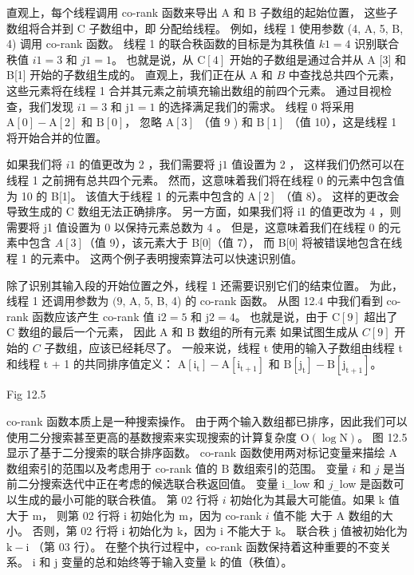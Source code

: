 直观上，每个线程调用 co-rank 函数来导出 $\mathrm{A}$ 和 $\mathrm{B}$ 子数组的起始位置，
这些子数组将合并到 $\mathrm{C}$ 子数组中，即 分配给线程。 例如，线程 1 使用参数 (4, A, 5, B, 4) 调用 co-rank 函数。 
线程 1 的联合秩函数的目标是为其秩值 $k 1=4$ 识别联合秩值 $i 1=3$ 和 $j 1=1$。 
也就是说，从 $\mathrm{C}[4]$ 开始的子数组是通过合并从 $\mathrm{A}$ [3] 和 B[1] 开始的子数组生成的。 
直观上，我们正在从 A 和 $B$ 中查找总共四个元素，这些元素将在线程 1 合并其元素之前填充输出数组的前四个元素。 
通过目视检查，我们发现 $i 1=3$ 和 $\mathrm{j} 1=1$ 的选择满足我们的需求。 
线程 0 将采用 $\mathrm{A}[0]-\mathrm{A}[2]$ 和 $\mathrm{B}[0]$，
忽略 $\mathrm{A}[3]$ （值 9 ) 和 $\mathrm{B}[1]$ （值 10），这是线程 1 将开始合并的位置。

如果我们将 $i 1$ 的值更改为 2 ，我们需要将 $\mathrm{j} 1$ 值设置为 2 ，
这样我们仍然可以在线程 1 之前拥有总共四个元素。 然而，这意味着我们将在线程 0 的元素中包含值为 10 的 B[1]。 
该值大于线程 1 的元素中包含的 $\mathrm{A}[2]$ （值 8）。 这样的更改会导致生成的 $\mathrm{C}$ 数组无法正确排序。 
另一方面，如果我们将 i1 的值更改为 4 ，则需要将 j1 值设置为 0 以保持元素总数为 4 。 
但是，这意味着我们在线程 0 的元素中包含 $A[3]$（值 9），该元素大于 B[0]（值 7），
而 B[0] 将被错误地包含在线程 1 的元素中。 这两个例子表明搜索算法可以快速识别值。

除了识别其输入段的开始位置之外，线程 1 还需要识别它们的结束位置。 
为此，线程 1 还调用参数为 $(9$, A, 5, B, 4) 的 co-rank 函数。 
从图 12.4 中我们看到 co-rank 函数应该产生 co-rank 值 $\mathrm{i} 2=5$ 和 $\mathrm{j} 2=4$。 
也就是说，由于 $\mathrm{C}[9]$ 超出了 $\mathrm{C}$ 数组的最后一个元素，
因此 $\mathrm{A}$ 和 $\mathrm{B}$ 数组的所有元素 如果试图生成从 $C[9]$ 开始的 $C$ 子数组，应该已经耗尽了。 
一般来说，线程 t 使用的输入子数组由线程 t 和线程 t + 1 的共同排序值定义：
$\mathrm{A}\left[ \mathrm{i}_{\mathrm{t}}\right]-\mathrm{A}\left[\mathrm{i}_{\mathrm{t}+1}\right]$ 
和 $\mathrm{B }\left[\mathrm{j}_{\mathrm{t}}\right]-\mathrm{B}\left[\mathrm{j}_{\mathrm{t}+1}\right]$。

{\color{red} Fig 12.5}

co-rank 函数本质上是一种搜索操作。 
由于两个输入数组都已排序，因此我们可以使用二分搜索甚至更高的基数搜索来实现搜索的计算复杂度 $\mathrm{O}(\log \mathrm{N})$。 图 12.5 显示了基于二分搜索的联合排序函数。 
co-rank 函数使用两对标记变量来描绘 $\mathrm{A}$ 数组索引的范围以及考虑用于 co-rank 值的 $\mathrm{B}$ 数组索引的范围。 变量 $i$ 和 $j$ 是当前二分搜索迭代中正在考虑的候选联合秩返回值。 
变量 i\_low 和 $j_{-}$low 是函数可以生成的最小可能的联合秩值。 
第 02 行将 $i$ 初始化为其最大可能值。如果 $\mathrm{k}$ 值大于 $\mathrm{m}$，
则第 02 行将 $\mathrm{i}$ 初始化为 $\mathrm{m}$，因为 co-rank $i$ 值不能 大于 A 数组的大小。 
否则，第 02 行将 $\mathrm{i}$ 初始化为 $\mathrm{k}$，因为 $\mathrm{i}$ 不能大于 $\mathrm{k}$。 
联合秩 $\mathrm{j}$ 值被初始化为 $\mathrm{k}-\mathrm{i}$ （第 03 行）。 
在整个执行过程中，co-rank 函数保持着这种重要的不变关系。 
$\mathrm{i}$ 和 $\mathrm{j}$ 变量的总和始终等于输入变量 $\mathrm{k}$ 的值（秩值）。

